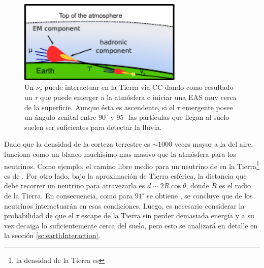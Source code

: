 \begin{figure}[ht]
\begin{center}
\includegraphics[width=0.7\textwidth]{fig/EASAuger/horizontal_es_english.pdf}
\caption{Un $\nu_{\tau}$ puede interactuar en la Tierra via CC dando como resultado un $\tau$ que puede emerger a la atmósfera e iniciar una EAS muy cerca de la superficie.
Aunque \'esta es ascendente, si el $\tau$ emergente posee un ángulo zenital entre $90^\circ$ y $95^\circ$ las partículas que llegan al suelo suelen ser suficientes para detectar la lluvia.}
\label{fig:esNu}
\end{center}
\end{figure}

Dado que la densidad de la corteza terrestre es $\sim1000$ veces mayor a la del aire, funciona como un blanco muchísimo mas masivo que la atmósfera para los neutrinos.
Como ejemplo, el camino libre medio para un neutrino de  en la Tierra\footnote{la densidad de la Tierra es } es de .
Por otro lado, bajo la aproximación de Tierra esférica, la distancia que debe recorrer un neutrino para atravezarla es $d\sim2R\cos{\theta}$, donde $R$ es el radio de la Tierra. 
En consecuencia, como para $91^{\circ}$ se obtiene , se concluye que  de los neutrinos interactuarán en esas condiciones.
Luego, es necesario considerar la probabilidad de que el $\tau$ escape de la Tierra sin perder demasiada energía y a su vez decaiga lo suficientemente cerca del suelo, pero esto se analizará en detalle en la sección \ref{sc:earthInteraction}.
